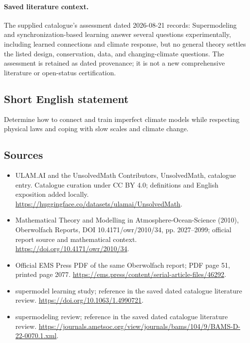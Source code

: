 \documentclass[11pt]{article}
\begin{document}
\paragraph{Saved literature context.} The supplied catalogue's assessment dated 2026-08-21 records: Supermodeling and synchronization-based learning answer several questions experimentally, including learned connections and climate response, but no general theory settles the listed design, conservation, data, and changing-climate questions. The assessment is retained as dated provenance; it is not a new comprehensive literature or open-status certification.
\subsection{Short English statement}
Determine how to connect and train imperfect climate models while respecting physical laws and coping with slow scales and climate change.
\subsection{Sources}
\begin{itemize}
\item[\hypertarget{source:statement:1}{S1}] ULAM.AI and the UnsolvedMath Contributors, UnsolvedMath, catalogue entry. Catalogue curation under CC BY 4.0; definitions and English exposition added locally.
\url{https://huggingface.co/datasets/ulamai/UnsolvedMath}.
\item[\hypertarget{source:statement:2}{S2}] Mathematical Theory and Modelling in Atmosphere-Ocean-Science (2010), Oberwolfach Reports, DOI 10.4171/owr/2010/34, pp. 2027--2099; official report source and mathematical context.
\url{https://doi.org/10.4171/owr/2010/34}.
\item[\hypertarget{source:statement:3}{S3}] Official EMS Press PDF of the same Oberwolfach report; PDF page 51, printed page 2077.
\url{https://ems.press/content/serial-article-files/46292}.
\item[\hypertarget{source:statement:4}{S4}] supermodel learning study; reference in the saved dated catalogue literature review.
\url{https://doi.org/10.1063/1.4990721}.
\item[\hypertarget{source:statement:5}{S5}] supermodeling review; reference in the saved dated catalogue literature review.
\url{https://journals.ametsoc.org/view/journals/bams/104/9/BAMS-D-22-0070.1.xml}.
\end{itemize}
\label{end:statement}
\end{document}
